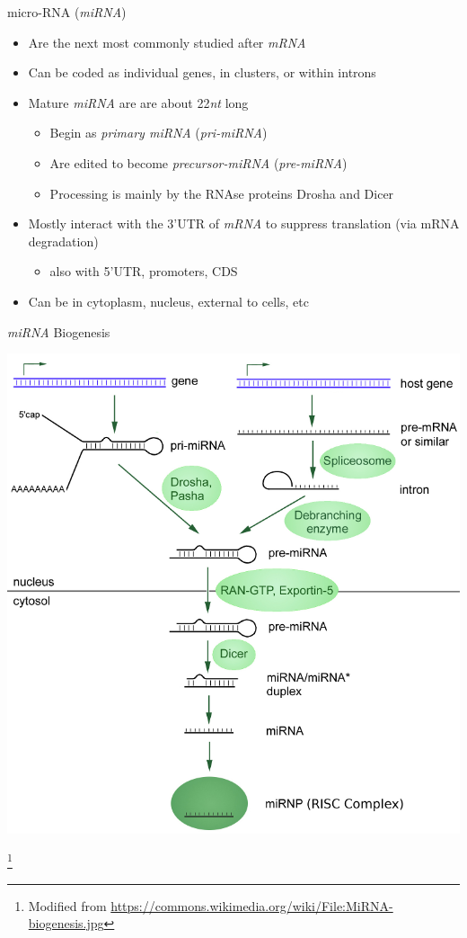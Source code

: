 \documentclass[aspectratio=169,11pt]{beamer}
\newcommand\blfootnote[1]{%
  \begingroup
  \renewcommand\thefootnote{}\footnote{#1}%
  \addtocounter{footnote}{-1}%
  \endgroup
}
\begin{document}
\begin{frame}{micro-RNA (\textit{miRNA})}

	\begin{itemize}
		\item Are the next most commonly studied after \textit{mRNA}
		\item Can be coded as individual genes, in clusters, or within introns
		\item Mature \textit{miRNA} are are about 22\textit{nt} long
		\begin{itemize}
			\item Begin as \textit{primary miRNA} (\textit{pri-miRNA})
			\item Are edited to become \textit{precursor-miRNA} (\textit{pre-miRNA})
			\item Processing is mainly by the RNAse proteins Drosha and Dicer
		\end{itemize}
		\item Mostly interact with the 3'UTR of \textit{mRNA} to suppress translation (via mRNA degradation)
		\begin{itemize}
			\item also with 5'UTR, promoters, CDS
		\end{itemize}
		\item Can be in cytoplasm, nucleus, external to cells, etc
	\end{itemize}

\end{frame}

\begin{frame}{\textit{miRNA} Biogenesis}

	\begin{center}
	\includegraphics[scale=0.22]{figures/MiRNA-biogenesis.png} 
	\end{center}

	\blfootnote{Modified from \url{https://commons.wikimedia.org/wiki/File:MiRNA-biogenesis.jpg}}
\end{frame}
\end{document}
